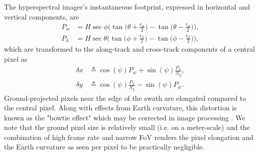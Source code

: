 The hyperspectral imager's instantaneous footprint, expressed in horizontal and vertical components, are
\begin{subequations}
\begin{align}
P_{w} &= H\sec\phi\bigg(\tan\Big(\theta+\frac{\epsilon_w}{2}\Big)-\tan\Big(\theta-\frac{\epsilon_w}{2}\Big)\bigg), \\
P_{h} &= H\sec\theta\bigg(\tan\Big(\phi+\frac{\epsilon_h}{2}\Big)-\tan\Big(\phi-\frac{\epsilon_h}{2}\Big)\bigg),
\end{align}
\end{subequations}
\noindent which are transformed to the along-track and cross-track components of a central pixel as
\begin{subequations}
\begin{align}
\delta x &\triangleq \cos(\psi)P_{w}+\sin(\psi)\frac{P_{h}}{N_{y}}, \label{eq:footprint_x}\\
\delta y &\triangleq \cos(\psi)\frac{P_{h}}{N_{y}}-\sin(\psi)P_w. \label{eq:footprint_y}
\end{align}
\end{subequations}
Ground-projected pixels near the edge of the swath are elongated compared to the central pixel. Along with effects from Earth curvature, this distortion is known as the "bowtie effect" which may be corrected in image processing \cite{Richards1999, Sayer2015}. We note that the ground pixel size is relatively small (i.e. on a meter-scale) and the combination of high frame rate and narrow FoV renders the pixel elongation and the Earth curvature as seen per pixel to be practically negligible.
